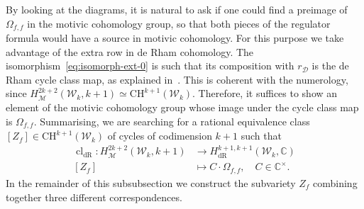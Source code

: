 \documentclass[11pt, a4paper, reqno]{amsart}
\theoremstyle{definition}
\theoremstyle{plain}
\theoremstyle{remark}
\DeclareMathOperator{\cl}{cl}
\DeclareMathOperator{\dR}{dR}
\DeclareMathOperator{\mot}{\mathscr{M}}
\newcommand{\numberset}{\mathbb}
\newcommand{\C}{\numberset{C}}
\newcommand{\CH}{\mathrm{CH}}
\newcommand{\KS}{\mathscr{W}}
\newcommand{\del}{\mathcal{D}}
\newcommand{\regulator}[1]{r_{#1}}
\newcommand{\rD}{\regulator{\del}}
\begin{document}
By looking at the diagrams, it is natural to ask if one could find a preimage of $\Omega_{f,f}$ in the motivic cohomology group, so that both pieces of the regulator formula would have a source in motivic cohomology. For this purpose we take advantage of the extra row in de Rham cohomology. The isomorphism~\eqref{eq:isomorph-ext-0} is such that its composition with $\rD$ is the de Rham cycle class map, as explained in~\cite[§7]{esnaultviehweg}. This is coherent with the numerology, since $H^{2k+2}_{\mot}(\KS_k,k+1) \simeq \CH^{k+1}(\KS_k)$. Therefore, it suffices to show an element of the motivic cohomology group whose image under the cycle class map is $\Omega_{f,f}$. Summarising, we are searching for a rational equivalence class $[Z_f]\in\CH^{k+1}(\KS_k)$ of cycles of codimension $k+1$ such that
\begin{align*}
    \cl_{\dR} \colon H_{\mot}^{2k+2}(\KS_k,k+1) &\to H^{k+1,k+1}_{\dR}(\KS_k,\C) \\
    [Z_f] &\mapsto C\cdot \Omega_{f,f}, \quad C \in \C^{\times}.
\end{align*}
In the remainder of this subsubsection we construct the subvariety $Z_f$ combining together three different correspondences.
\end{document}
